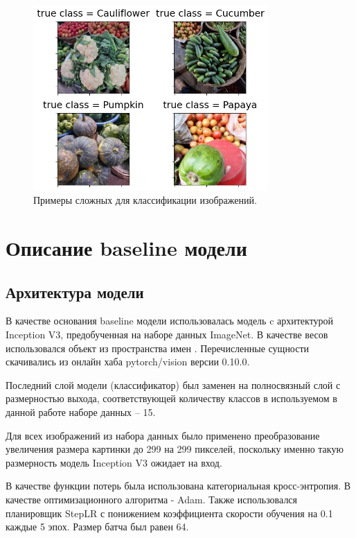 \documentclass[a4paper,12pt]{extarticle}
\begin{document}
\begin{figure}[ht]
	\centering
	\includegraphics[width=0.8\textwidth]{EDA_outliers.png}
	\caption{Примеры сложных для классификации изображений.}
	\label{fig:EDA_outliers}
\end{figure}

\newpage
\section{Описание baseline модели}

\subsection{Архитектура модели}

В качестве основания baseline модели использовалась модель c архитектурой Inception V3, предобученная
на наборе данных ImageNet. В качестве весов использовался объект  из пространства имен 
. Перечисленные сущности скачивались из онлайн хаба
pytorch/vision версии 0.10.0.

Последний слой модели (классификатор) был заменен на полносвязный слой с размерностью выхода,
соответствующей количеству классов в используемом в данной работе наборе данных – 15.

Для всех изображений из набора данных было применено преобразование увеличения размера картинки до
299 на 299 пикселей, поскольку именно такую размерность модель Inception V3 ожидает на вход.

В качестве функции потерь была использована категориальная кросс-энтропия. В качестве
оптимизационного алгоритма - Adam. Также использовался планировщик StepLR с понижением коэффициента
скорости обучения на 0.1 каждые 5 эпох. Размер батча был равен 64.
\end{document}
